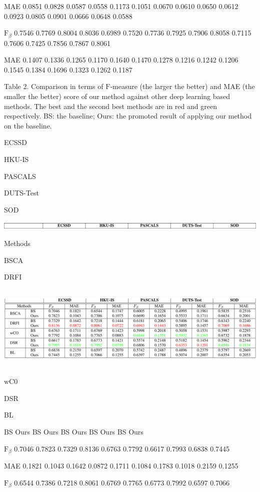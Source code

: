 \documentclass[a4paper,10pt]{article}
\begin{document}
MAE 0.0851 0.0828 0.0587 0.0558 0.1173 0.1051 0.0670 0.0610 0.0650 0.0612 0.0923 0.0805 0.0901 0.0666 0.0648 0.0588

$\mathrm{F}_{\beta}$ 0.7546 0.7769 0.8004 0.8036 0.6989 0.7520 0.7736 0.7925 0.7906 0.8058 0.7115 0.7606 0.7425 0.7856 0.7867 0.8061

MAE 0.1407 0.1336 0.1265 0.1170 0.1640 0.1470 0.1278 0.1216 0.1242 0.1206 0.1545 0.1384 0.1696 0.1323 0.1262 0.1187

Table 2. Comparison in terms of $\mathrm{F}$-measure (the larger the better) and MAE (the smaller the better) score of our method against other deep learning based methods. The best and the second best methods are in red and green respectively. BS: the baseline; Ours: the promoted result of applying our method on the baseline.

ECSSD

HKU-IS

PASCALS

DUTS-Test

SOD
\begin{center}
\includegraphics[width=174.24mm,height=3.64mm]{./zengyu_images/image018.eps}
\end{center}
Methods

BSCA

DRFI
\begin{center}
\includegraphics[width=175.09mm,height=41.49mm]{./zengyu_images/image019.eps}
\end{center}
$\mathrm{w}\mathrm{C}0$

DSR

BL

BS Ours BS Ours BS Ours BS Ours BS Ours

$\mathrm{F}_{\beta}$ 0.7046 0.7823 0.7329 0.8136 0.6763 0.7792 0.6617 0.7993 0.6838 0.7445

MAE 0.1821 0.1043 0.1642 0.0872 0.1711 0.1084 0.1783 0.1018 0.2159 0.1255

$\mathrm{F}_{\beta}$ 0.6544 0.7386 0.7218 0.8061 0.6769 0.7765 0.6773 0.7992 0.6597 0.7066
\end{document}
